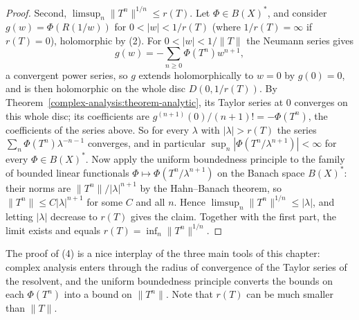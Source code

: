 \begin{proof}
Second, $\limsup_n\|T^n\|^{1/n} \leq r(T)$. Let $\Phi \in B(X)^*$, and consider $g(w) = \Phi(R(1/w))$ for $0 < |w| < 1/r(T)$ (where $1/r(T) = \infty$ if $r(T) = 0$), holomorphic by (2). For $0 < |w| < 1/\|T\|$ the
Neumann series gives
\[
g(w) = -\sum_{n \geq 0}\Phi(T^n)w^{n+1},
\]
a convergent power series, so $g$ extends holomorphically to $w = 0$ by $g(0) = 0$, and is then holomorphic on the whole disc $D(0, 1/r(T))$. By Theorem~\ref{complex-analysis:theorem-analytic}, its Taylor series at
$0$ converges on this whole disc; its coefficients are $g^{(n+1)}(0)/(n + 1)! = -\Phi(T^n)$, the coefficients of the series above. So for every $\lambda$ with $|\lambda| > r(T)$ the series
$\sum_n\Phi(T^n)\lambda^{-n-1}$ converges, and in particular $\sup_n|\Phi(T^n/\lambda^{n+1})| < \infty$ for every $\Phi \in B(X)^*$. Now apply the uniform boundedness principle to the family of bounded linear
functionals $\Phi \mapsto \Phi(T^n/\lambda^{n+1})$ on the Banach space $B(X)^*$: their norms are $\|T^n\|/|\lambda|^{n+1}$ by the Hahn--Banach theorem, so $\|T^n\| \leq C|\lambda|^{n+1}$ for some $C$ and all $n$. Hence
$\limsup_n\|T^n\|^{1/n} \leq |\lambda|$, and letting $|\lambda|$ decrease to $r(T)$ gives the claim. Together with the first part, the limit exists and equals $r(T) = \inf_n\|T^n\|^{1/n}$.
\end{proof}

The proof of (4) is a nice interplay of the three main tools of this chapter: complex analysis enters through the radius of convergence of the Taylor series of the resolvent, and the uniform
boundedness principle converts the bounds on each $\Phi(T^n)$ into a bound on $\|T^n\|$. Note that $r(T)$ can be much smaller than $\|T\|$.

